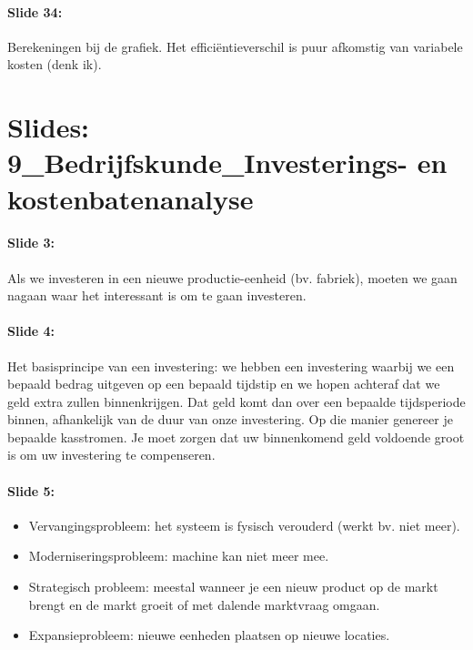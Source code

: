 \documentclass[10pt,a4paper]{report}
\begin{document}
\paragraph{Slide 34:} Berekeningen bij de grafiek. Het effici\"entieverschil is puur afkomstig van variabele kosten (denk ik).
    
\section{Slides: 9\_Bedrijfskunde\_Investerings- en kostenbatenanalyse}

\paragraph{Slide 3:} Als we investeren in een nieuwe productie-eenheid (bv. fabriek), moeten we gaan nagaan waar het interessant is om te gaan investeren. 

\paragraph{Slide 4:} Het basisprincipe van een investering: we hebben een investering waarbij we een bepaald bedrag uitgeven op een bepaald tijdstip en we hopen achteraf dat we geld extra zullen binnenkrijgen. Dat geld komt dan over een bepaalde tijdsperiode binnen, afhankelijk van de duur van onze investering. Op die manier genereer je bepaalde kasstromen. Je moet zorgen dat uw binnenkomend geld voldoende groot is om uw investering te compenseren.

\paragraph{Slide 5:}
\begin{itemize} 
\item Vervangingsprobleem: het systeem is fysisch verouderd (werkt bv. niet meer). 
\item Moderniseringsprobleem: machine kan niet meer mee.
\item Strategisch probleem: meestal wanneer je een nieuw product op de markt brengt en de markt groeit of met dalende marktvraag omgaan.
\item Expansieprobleem: nieuwe eenheden plaatsen op nieuwe locaties.
\end{itemize}
\end{document}
